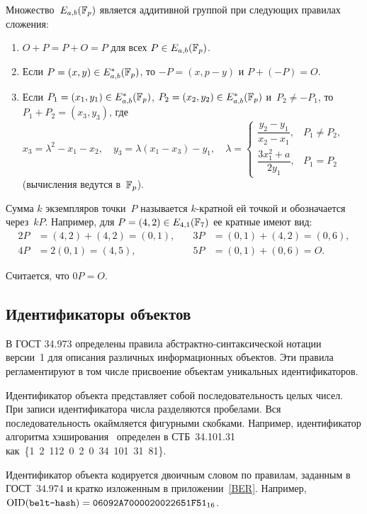 Множество~$E_{a,b}(\mathbb{F}_p)$ является аддитивной группой 
при следующих правилах сложения:
\begin{enumerate}
\item
$O+P=P+O=P$ для всех $P\in E_{a,b}(\mathbb{F}_p)$.

\item
Если $P=(x,y)\in E_{a,b}^*(\mathbb{F}_p)$, то $-P=(x,p-y)$ и $P+(-P)=O$.

\item
Если $P_1=(x_1,y_1)\in E_{a,b}^*(\mathbb{F}_p)$,
$P_2=(x_2,y_2)\in E_{a,b}^*(\mathbb{F}_p)$ и~$P_2\neq -P_1$, 
то $P_1+P_2=(x_3,y_3)$,
где
$
x_3=\lambda^2-x_1-x_2,\quad
y_3=\lambda(x_1-x_3)-y_1,\quad
\lambda=\left\{
\begin{array}{rl}
\dfrac{y_2-y_1}{x_2-x_1}, & P_1\neq P_2,\\[12pt]
\dfrac{3x_1^2+a}{2 y_1}, & P_1=P_2
\end{array}
\right.
$\\
(вычисления ведутся в~$\mathbb{F}_p$).
\end{enumerate}

Сумма $k$ экземпляров точки~$P$ называется $k$-кратной ей точкой 
и обозначается через~$kP$.
Например, для $P=(4,2)\in E_{4,1}(\mathbb{F}_7)$ ее кратные имеют вид:
\begin{align*}
2P&=(4,2)+(4,2)=(0,1),\quad
&3P&=(0,1)+(4,2)=(0,6),\\
4P&=2(0,1)=(4,5),\quad
&5P&=(0,1)+(0,6)=O.
\end{align*}

Считается, что $0P=O$.

\subsection{Идентификаторы объектов}

В ГОСТ 34.973 определены правила абстрактно-синтаксической нотации 
версии~1 для описания различных информационных объектов. 
Эти правила регламентируют в том числе
присвоение объектам уникальных идентификаторов.

Идентификатор объекта представляет собой последовательность 
целых чисел. При записи идентификатора числа разделяются пробелами.
Вся последовательность окай\-мляется фигурными скобками.
Например, идентификатор алгоритма хэширования~
определен в СТБ~34.101.31 как~\{1~2~112~0~2~0~34~101~31~81\}.

Идентификатор объекта кодируется двоичным словом по правилам,
заданным в ГОСТ~34.974 и кратко изложенным в приложении~\ref{BER}.
Например, $\text{\normalfont OID}(\texttt{belt-hash})=\texttt{06092A7000020022651F51}_{16}$.


